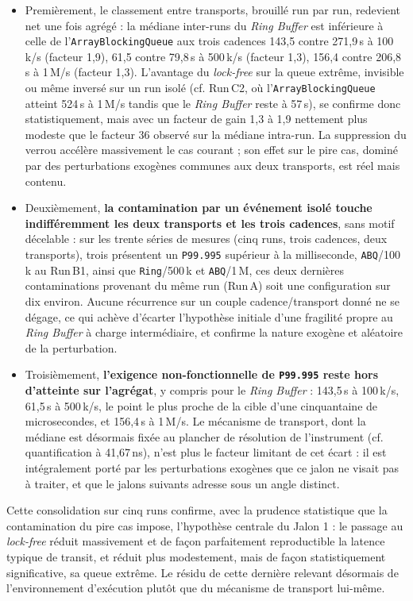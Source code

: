 \begin{itemize}
    \item Premièrement, le classement entre transports, brouillé run par run, redevient net une fois agrégé : la médiane inter-runs du \textit{Ring Buffer} est inférieure à celle de l'\texttt{ArrayBlockingQueue} aux trois cadences 143,5 contre 271,9\,\textmu s à 100\,k/s (facteur 1,9), 61,5 contre 79,8\,\textmu s à 500\,k/s (facteur 1,3), 156,4 contre 206,8\,\textmu s à 1\,M/s (facteur 1,3). L'avantage du \textit{lock-free} sur la queue extrême, invisible ou même inversé sur un run isolé (cf. Run\,C2, où l'\texttt{ArrayBlockingQueue} atteint 524\,\textmu s à 1\,M/s tandis que le \textit{Ring Buffer} reste à 57\,\textmu s), se confirme donc statistiquement, mais avec un facteur de gain 1,3 à 1,9 nettement plus modeste que le facteur 36 observé sur la médiane intra-run. La suppression du verrou accélère massivement le cas courant ; son effet sur le pire cas, dominé par des perturbations exogènes communes aux deux transports, est réel mais contenu.
    \item Deuxièmement, \textbf{la contamination par un événement isolé touche indifféremment les deux transports et les trois cadences}, sans motif décelable : sur les trente séries de mesures (cinq runs, trois cadences, deux transports), trois présentent un \texttt{P99.995} supérieur à la milliseconde, \texttt{ABQ}/100\,k au Run\,B1, ainsi que \texttt{Ring}/500\,k et \texttt{ABQ}/1\,M, ces deux dernières contaminations provenant du même run (Run\,A) soit une configuration sur dix environ. Aucune récurrence sur un couple cadence/transport donné ne se dégage, ce qui achève d'écarter l'hypothèse initiale d'une fragilité propre au \textit{Ring Buffer} à charge intermédiaire, et confirme la nature exogène et aléatoire de la perturbation.
    \item Troisièmement, \textbf{l'exigence non-fonctionnelle de \texttt{P99.995} reste hors d'atteinte sur l'agrégat}, y compris pour le \textit{Ring Buffer} : 143,5\,\textmu s à 100\,k/s, 61,5\,\textmu s à 500\,k/s, le point le plus proche de la cible d'une cinquantaine de microsecondes, et 156,4\,\textmu s à 1\,M/s. Le mécanisme de transport, dont la médiane est désormais fixée au plancher de résolution de l'instrument (cf. quantification à 41,67\,ns), n'est plus le facteur limitant de cet écart : il est intégralement porté par les perturbations exogènes que ce jalon ne visait pas à traiter, et que le jalons suivants adresse sous un angle distinct.
\end{itemize}

Cette consolidation sur cinq runs confirme, avec la prudence statistique que la contamination du pire cas impose, l'hypothèse centrale du Jalon 1 : le passage au \textit{lock-free} réduit massivement et de façon parfaitement reproductible la latence typique de transit, et réduit plus modestement, mais de façon statistiquement significative, sa queue extrême. Le résidu de cette dernière relevant désormais de l'environnement d'exécution plutôt que du mécanisme de transport lui-même.